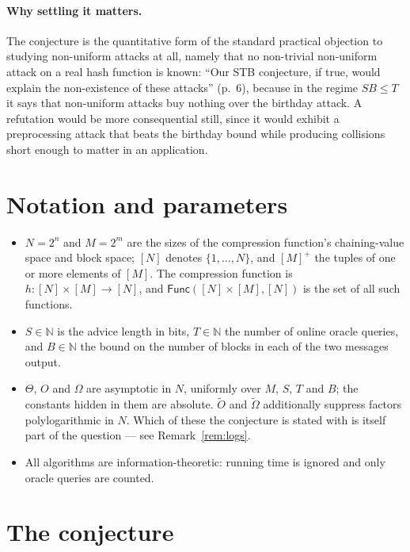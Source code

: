 \documentclass{aicr-conjecture}
\newcommand{\Func}{\mathsf{Func}}
\newcommand{\tO}{\tilde{O}}
\newcommand{\tOm}{\tilde{\Omega}}
\begin{document}
\paragraph{Why settling it matters.}
The conjecture is the quantitative form of the standard practical
objection to studying non-uniform attacks at all, namely that no
non-trivial non-uniform attack on a real hash function is known: ``Our
STB conjecture, if true, would explain the non-existence of these
attacks'' (p.~6), because in the regime $SB \le T$ it says that
non-uniform attacks buy nothing over the birthday attack. A refutation
would be more consequential still, since it would exhibit a
preprocessing attack that beats the birthday bound while producing
collisions short enough to matter in an application.

\section{Notation and parameters}\label{sec:notation}

\begin{itemize}
\item $N = 2^{n}$ and $M = 2^{m}$ are the sizes of the compression
  function's chaining-value space and block space; $[N]$ denotes
  $\{1,\dots,N\}$, and $[M]^{+}$ the tuples of one or more elements of
  $[M]$. The compression function is $h : [N] \times [M] \to [N]$, and
  $\Func([N] \times [M], [N])$ is the set of all such functions.
\item $S \in \mathbb{N}$ is the advice length in bits, $T \in
  \mathbb{N}$ the number of online oracle queries, and $B \in
  \mathbb{N}$ the bound on the number of blocks in each of the two
  messages output.
\item $\Theta$, $O$ and $\Omega$ are asymptotic in $N$, uniformly over
  $M$, $S$, $T$ and $B$; the constants hidden in them are absolute.
  $\tO$ and $\tOm$ additionally suppress factors polylogarithmic in
  $N$. Which of these the conjecture is stated with is itself part of
  the question --- see Remark~\ref{rem:logs}.
\item All algorithms are information-theoretic: running time is
  ignored and only oracle queries are counted.
\end{itemize}

\section{The conjecture}\label{sec:conjectures}
\end{document}
